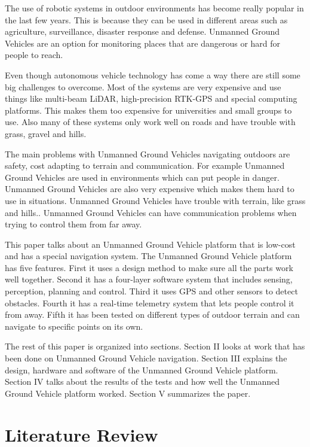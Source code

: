\documentclass[runningheads]{llncs}
\begin{document}
The use of robotic systems in outdoor environments has become really popular in the last few years. This is because they can be used in different areas such as agriculture, surveillance, disaster response and defense. Unmanned Ground Vehicles are an option for monitoring places that are dangerous or hard for people to reach.

Even though autonomous vehicle technology has come a way there are still some big challenges to overcome. Most of the systems are very expensive and use things like multi-beam LiDAR, high-precision RTK-GPS and special computing platforms. This makes them too expensive for universities and small groups to use. Also many of these systems only work well on roads and have trouble with grass, gravel and hills.

The main problems with Unmanned Ground Vehicles navigating outdoors are safety, cost adapting to terrain and communication. For example Unmanned Ground Vehicles are used in environments which can put people in danger. Unmanned Ground Vehicles are also very expensive which makes them hard to use in situations. Unmanned Ground Vehicles have trouble with terrain, like grass and hills.. Unmanned Ground Vehicles can have communication problems when trying to control them from far away.

This paper talks about an Unmanned Ground Vehicle platform that is low-cost and has a special navigation system. The Unmanned Ground Vehicle platform has five features. First it uses a design method to make sure all the parts work well together. Second it has a four-layer software system that includes sensing, perception, planning and control. Third it uses GPS and other sensors to detect obstacles. Fourth it has a real-time telemetry system that lets people control it from away. Fifth it has been tested on different types of outdoor terrain and can navigate to specific points on its own.

The rest of this paper is organized into sections. Section II looks at work that has been done on Unmanned Ground Vehicle navigation. Section III explains the design, hardware and software of the Unmanned Ground Vehicle platform. Section IV talks about the results of the tests and how well the Unmanned Ground Vehicle platform worked. Section V summarizes the paper.

\section{Literature Review}
\label{sec:literature}
\end{document}
